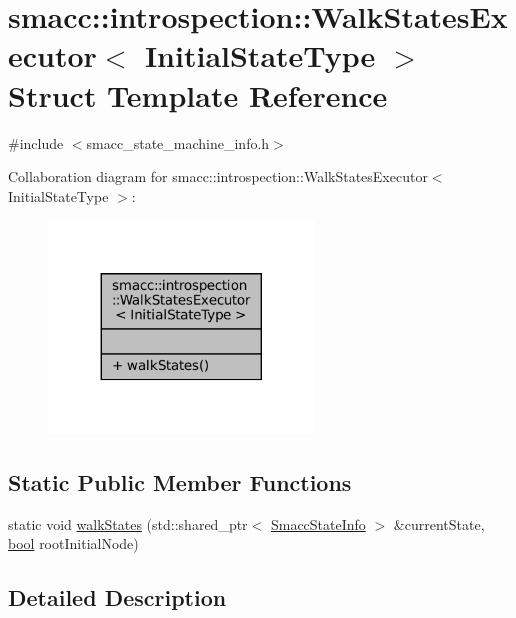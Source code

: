 \hypertarget{structsmacc_1_1introspection_1_1WalkStatesExecutor}{}\section{smacc\+:\+:introspection\+:\+:Walk\+States\+Executor$<$ Initial\+State\+Type $>$ Struct Template Reference}
\label{structsmacc_1_1introspection_1_1WalkStatesExecutor}


{\ttfamily \#include $<$smacc\+\_\+state\+\_\+machine\+\_\+info.\+h$>$}



Collaboration diagram for smacc\+:\+:introspection\+:\+:Walk\+States\+Executor$<$ Initial\+State\+Type $>$\+:
\nopagebreak
\begin{figure}[H]
\begin{center}
\leavevmode
\includegraphics[width=200pt]{structsmacc_1_1introspection_1_1WalkStatesExecutor__coll__graph}
\end{center}
\end{figure}
\subsection*{Static Public Member Functions}
\begin{DoxyCompactItemize}
\item 
static void \hyperlink{structsmacc_1_1introspection_1_1WalkStatesExecutor_a21848ccc6e7a7ddee0ccfff97e550ec6}{walk\+States} (std\+::shared\+\_\+ptr$<$ \hyperlink{classsmacc_1_1introspection_1_1SmaccStateInfo}{Smacc\+State\+Info} $>$ \&current\+State, \hyperlink{classbool}{bool} root\+Initial\+Node)
\end{DoxyCompactItemize}


\subsection{Detailed Description}
